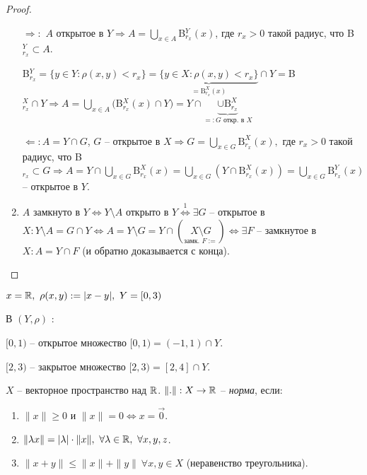 \begin{proof}~
    \begin{enumerate}
        \item [$\Rightarrow:$]$A$ открытое в $Y\Rightarrow A=\bigcup\limits_{x\in A}$B$_{r_x}^Y(x)$, где $r_x>0$ такой радиус, что B$^Y_{r_x}\subset A$.

        B$_{r_x}^Y=\{y\in Y:\rho(x, y)<r_x\}=\underbrace{\{y\in X:\rho(x, y)<r_x\}}_{=\text{B}^X_{r_x}(x)} \cap  Y=$B$_{r_x}^X\cap Y\Rightarrow A = \bigcup\limits_{x\in A}($B$_{r_x}^X(x) \cap Y)=Y \cap \underbrace{\cup\text{B}^X_{r_x}}_{=:G\text{ откр. в }X}$

        $\Leftarrow:A=Y\cap G$, $G$ – открытое в $X\Rightarrow G=\bigcup\limits_{x\in G}\text{B}^X_{r_x}(x),$ где $r_x>0$ такой радиус, что B$_{r_x}\subset G\Rightarrow A = Y \cap \bigcup\limits_{x\in G}\text{B}^X_{r_x}(x)=\bigcup\limits_{x\in G}(Y\cap \text{B}^X_{r_x}(x))=\bigcup\limits_{x\in G}\text{B}^Y_{r_x}(x)$ –  открытое в $Y$. 
        
        \item $A$ замкнуто в $Y\Leftrightarrow Y\setminus A$ открыто в $Y\overset{1}{\Leftrightarrow}\exists G$ – открытое в $X:Y\setminus A=G\cap Y\Leftrightarrow A=Y\setminus G=Y\cap(\underset{\text{замк. }F:=}{X\setminus G})\Leftrightarrow \exists F$ – замкнутое в $X:A=Y\cap F$ (и обратно доказывается с конца).
    \end{enumerate}
\end{proof}

\begin{example}
    $x=\mathbb{R},\ \rho(x, y):=|x-y|,\ Y=[0, 3)$

    В $(Y, \rho)$ :
    
    $[0, 1)$ – открытое множество $[0, 1)=(-1, 1)\cap Y$.

    $[2, 3)$ – закрытое множество $[2, 3)=[2, 4]\cap Y$.
\end{example}

\begin{definition}
    $X$ – векторное пространство над $\mathbb{R}$. $\|.\|:X\rightarrow \mathbb{R}$ – \textit{норма}, если:
    \begin{enumerate}
        \item $\|x\|\geq 0$ и $\|x\|=0\Leftrightarrow x=\vec{0}$.
        \item $\|\lambda x\|=|\lambda|\cdot \|x\|,\ \forall\lambda\in \R,\  \forall x, y, z$.
        \item $\|x+y\|\leq \|x\|+ \|y\|\ \forall x, y\in X$ (неравенство треугольника).
    \end{enumerate}
\end{definition}

